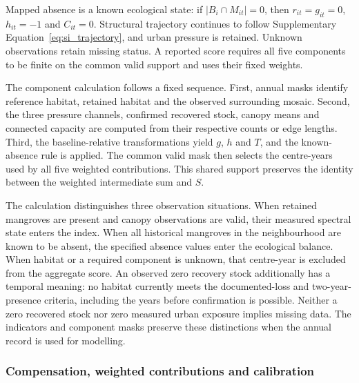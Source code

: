 Mapped absence is a known ecological state: if $|B_i\cap M_{it}|=0$, then $r_{it}=g_{it}=0$, $h_{it}=-1$ and $C_{it}=0$. Structural trajectory continues to follow Supplementary Equation~\eqref{eq:si_trajectory}, and urban pressure is retained. Unknown observations retain missing status. A reported score requires all five components to be finite on the common valid support and uses their fixed weights.

The component calculation follows a fixed sequence. First, annual masks identify reference habitat, retained habitat and the observed surrounding mosaic. Second, the three pressure channels, confirmed recovered stock, canopy means and connected capacity are computed from their respective counts or edge lengths. Third, the baseline-relative transformations yield $g$, $h$ and $T$, and the known-absence rule is applied. The common valid mask then selects the centre-years used by all five weighted contributions. This shared support preserves the identity between the weighted intermediate sum and $S$.

The calculation distinguishes three observation situations. When retained mangroves are present and canopy observations are valid, their measured spectral state enters the index. When all historical mangroves in the neighbourhood are known to be absent, the specified absence values enter the ecological balance. When habitat or a required component is unknown, that centre-year is excluded from the aggregate score. An observed zero recovery stock additionally has a temporal meaning: no habitat currently meets the documented-loss and two-year-presence criteria, including the years before confirmation is possible. Neither a zero recovered stock nor zero measured urban exposure implies missing data. The indicators and component masks preserve these distinctions when the annual record is used for modelling.

\subsubsection{Compensation, weighted contributions and calibration}

